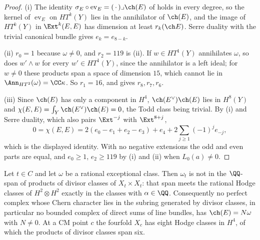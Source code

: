 \begin{proof}
(i) The identity $\sigma_{E}\circ\operatorname{ev}_{E}=(\,\cdot\,)\lrcorner
\ch(E)$ of \cite[Setup~2.7]{paperII} holds in every degree, so the kernel of
$\operatorname{ev}_{E}$ on $HT^{k}(Y)$ lies in the annihilator of $\ch(E)$,
and the image of $HT^{k}(Y)$ in $\Ext^{k}(E,E)$ has dimension at least
$r_{k}(\ch E)$. Serre duality with the trivial canonical bundle gives
$e_{k}=e_{8-k}$.

(ii) $r_{0}=1$ because $\omega\ne0$, and $r_{2}=119$ is
(ii). If $w\in HT^{1}(Y)$ annihilates $\omega$, so does
$w'\wedge w$ for every $w'\in HT^{1}(Y)$, since the annihilator is a left
ideal; for $w\ne0$ these products span a space of dimension $15$, which cannot
lie in $\Ann_{HT^{2}}(\omega)=\CC\kappa$. So $r_{1}=16$, and
 gives $r_{8},r_{7},r_{6}$.

(iii) Since $\ch(E)$ has only a component in $H^{4}$, $\ch(E^{\vee})\ch(E)$
lies in $H^{8}(Y)$ and $\chi(E,E)=\int_{Y}\ch(E^{\vee})\ch(E)=0$, the Todd
class being trivial. By (i) and Serre duality, which also pairs
$\Ext^{-j}$ with $\Ext^{8+j}$,
\[
  0=\chi(E,E)=2(e_{0}-e_{1}+e_{2}-e_{3})+e_{4}
  +2\sum_{j\ge1}(-1)^{j}e_{-j},
\]
which is the displayed identity. With no negative extensions the odd and even
parts are equal, and $e_{0}\ge1$, $e_{2}\ge119$ by (i) and (ii) when
$L_{0}(a)\ne0$.
\end{proof}

\begin{proposition}
\label{prop:mumforddivisor}
Let $t\in C$ and let $\omega$ be a rational exceptional class. Then $\omega_{t}$
is not in the $\QQ$-span of products of divisor classes of $X_{t}\times
X_{t}$: that span meets the rational Hodge classes of $H^{2}\otimes H^{2}$
exactly in the classes with $\alpha\in\QQ$. Consequently no perfect complex
whose Chern character lies in the subring generated by divisor classes, in
particular no bounded complex of direct sums of line bundles, has
$\ch(E)=N\omega$ with $N\ne0$. At a CM point $c$ the fourfold $X_{c}$ has eight
Hodge classes in $H^{4}$, of which the products of divisor classes span six.
\end{proposition}

